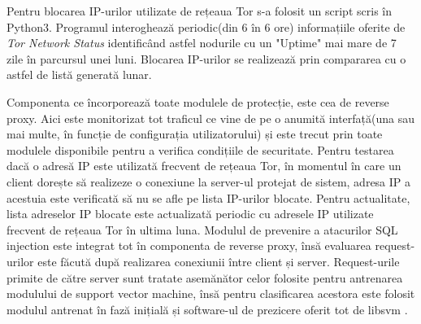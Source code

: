 Pentru blocarea IP-urilor utilizate de rețeaua Tor s-a folosit un script scris în Python3. Programul interoghează periodic(din 6 în 6 ore) informațiile oferite de \textit{Tor Network Status} \cite{tot_status} identificând astfel nodurile cu un "Uptime" mai mare de 7 zile în parcursul unei luni. Blocarea IP-urilor se realizează prin compararea cu o astfel de listă generată lunar. 

Componenta ce încorporează toate modulele de protecție, este cea de reverse proxy. Aici este monitorizat tot traficul ce vine de pe o anumită interfață(una sau mai multe, în funcție de configurația utilizatorului) și este trecut prin toate modulele disponibile pentru a verifica condițiile de securitate. Pentru testarea dacă o adresă IP este utilizată frecvent de rețeaua Tor, în momentul în care un client dorește să realizeze o conexiune la server-ul protejat de sistem, adresa IP a acestuia este verificată să nu se afle pe lista IP-urilor blocate. Pentru actualitate, lista adreselor IP blocate este actualizată periodic cu adresele IP utilizate frecvent de rețeaua Tor în ultima luna. Modulul de prevenire a atacurilor SQL injection este integrat tot în componenta de reverse proxy, însă evaluarea request-urilor este făcută după realizarea conexiunii între client și server. Request-urile primite de către server sunt tratate asemănător celor folosite pentru antrenarea modulului de support vector machine, însă pentru clasificarea acestora este folosit modulul antrenat în fază inițială și software-ul de prezicere oferit tot de libsvm \cite{libsvm}.
	
	

	





